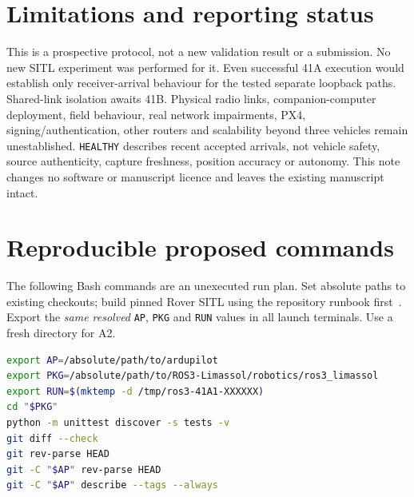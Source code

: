 \documentclass[10pt,a4paper]{article}
\begin{document}
\section{Limitations and reporting status}
This is a prospective protocol, not a new validation result or a submission.
No new SITL experiment was performed for it. Even successful 41A execution
would establish only receiver-arrival behaviour for the tested separate
loopback paths. Shared-link isolation awaits 41B. Physical radio links,
companion-computer deployment, field behaviour, real network impairments,
PX4, signing/authentication, other routers and scalability beyond three
vehicles remain unestablished. \texttt{HEALTHY} describes recent accepted
arrivals, not vehicle safety, source authenticity, capture freshness,
position accuracy or autonomy. This note changes no software or manuscript
licence and leaves the existing manuscript intact.

\appendix
\section{Reproducible proposed commands}
The following Bash commands are an unexecuted run plan. Set absolute paths
to existing checkouts; build pinned Rover SITL using the repository runbook
first~\cite{sitl}. Export the \emph{same resolved} \texttt{AP}, \texttt{PKG}
and \texttt{RUN} values in all launch terminals. Use a fresh directory for A2.
\begin{lstlisting}[language=bash]
export AP=/absolute/path/to/ardupilot
export PKG=/absolute/path/to/ROS3-Limassol/robotics/ros3_limassol
export RUN=$(mktemp -d /tmp/ros3-41A1-XXXXXX)
cd "$PKG"
python -m unittest discover -s tests -v
git diff --check
git rev-parse HEAD
git -C "$AP" rev-parse HEAD
git -C "$AP" describe --tags --always
\end{lstlisting}
\end{document}
